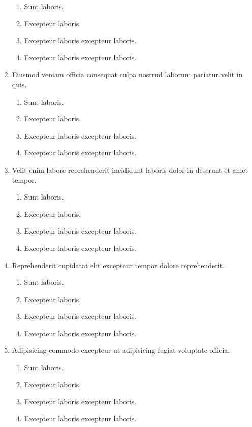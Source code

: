 \documentclass[a4paper,12pt]{article}
\begin{document}
\begin{enumerate}[label=\textbf{\arabic*.}]
\begin{enumerate}
    \item Sunt laboris.
    \item Excepteur laboris.
    \item Excepteur laboris excepteur laboris.
    \item Excepteur laboris excepteur laboris.
  \end{enumerate}
  \item Eiusmod veniam officia consequat culpa nostrud laborum pariatur velit in quis.
  \begin{enumerate}
    \item Sunt laboris.
    \item Excepteur laboris.
    \item Excepteur laboris excepteur laboris.
    \item Excepteur laboris excepteur laboris.
  \end{enumerate}
  \item Velit enim labore reprehenderit incididunt laboris dolor in deserunt et amet tempor.
  \begin{enumerate}
    \item Sunt laboris.
    \item Excepteur laboris.
    \item Excepteur laboris excepteur laboris.
    \item Excepteur laboris excepteur laboris.
  \end{enumerate}
  \item Reprehenderit cupidatat elit excepteur tempor dolore reprehenderit.
  \begin{enumerate}
    \item Sunt laboris.
    \item Excepteur laboris.
    \item Excepteur laboris excepteur laboris.
    \item Excepteur laboris excepteur laboris.
  \end{enumerate}
  \item Adipisicing commodo excepteur ut adipisicing fugiat voluptate officia.
  \begin{enumerate}
    \item Sunt laboris.
    \item Excepteur laboris.
    \item Excepteur laboris excepteur laboris.
    \item Excepteur laboris excepteur laboris.
  \end{enumerate}

\end{enumerate}
\end{document}
